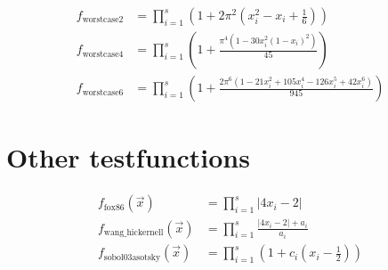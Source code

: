 \begin{align}
f_\text{worstcase2} &= \prod_{i=1}^s \left( 1 + 2\pi^2(x_i^2-x_i+\frac{1}{6})\right) \\
f_\text{worstcase4} &= \prod_{i=1}^s \left( 1 + \frac{\pi^4(1-30x_i^2(1-x_i)^2)}{45}
\right) \\
f_\text{worstcase6} &= \prod_{i=1}^s \left( 1 + \frac{2\pi^6(1-21x_i^2+105x_i^4-126x_i^5+42x_i^6)}{945} \right)
\end{align}

\section{Other testfunctions}

\begin{align}
f_\text{fox86}(\vec{x}) &= \prod_{i=1}^s|4x_i-2| \\
f_\text{wang\_hickernell}(\vec{x}) &= \prod_{i=1}^s \frac{|4x_i-2| + a_i}{a_i}
\\
f_\text{sobol03asotsky}(\vec{x}) &= \prod_{i=1}^s \left(1+c_i
\left(x_i-\frac{1}{2}\right) \right)
\end{align}
